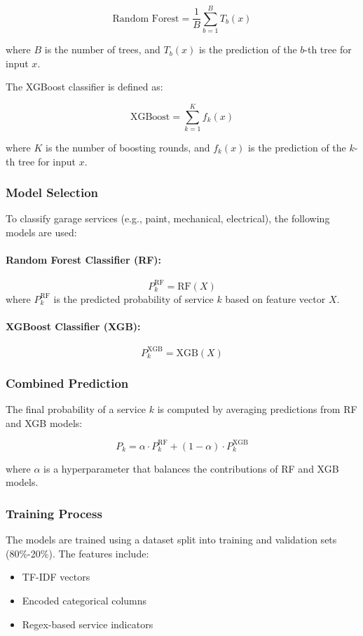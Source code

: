 \documentclass[conference]{IEEEtran}
\begin{document}
\[
\text{Random Forest} = \frac{1}{B} \sum_{b=1}^{B} T_b(x)
\]

where \( B \) is the number of trees, and \( T_b(x) \) is the prediction of the \( b \)-th tree for input \( x \).

The XGBoost classifier is defined as:

\[
\text{XGBoost} = \sum_{k=1}^{K} f_k(x)
\]

where \( K \) is the number of boosting rounds, and \( f_k(x) \) is the prediction of the \( k \)-th tree for input \( x \).


\subsubsection{Model Selection}
To classify garage services (e.g., paint, mechanical, electrical), the following models are used:

\paragraph{Random Forest Classifier (RF):}
\[
P_k^{\text{RF}} = \text{RF}(X)
\]
where \(P_k^{\text{RF}}\) is the predicted probability of service \(k\) based on feature vector \(X\).

\paragraph{XGBoost Classifier (XGB):}
\[
P_k^{\text{XGB}} = \text{XGB}(X)
\]

\subsubsection{Combined Prediction}
The final probability of a service \(k\) is computed by averaging predictions from RF and XGB models:

\[
P_k = \alpha \cdot P_k^{\text{RF}} + (1 - \alpha) \cdot P_k^{\text{XGB}}
\]

where \(\alpha\) is a hyperparameter that balances the contributions of RF and XGB models.

\subsubsection{Training Process}
The models are trained using a dataset split into training and validation sets (80\%-20\%). The features include:
\begin{itemize}
    \item TF-IDF vectors
    \item Encoded categorical columns
    \item Regex-based service indicators
\end{itemize}
\end{document}
